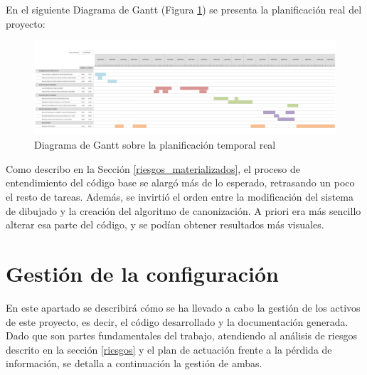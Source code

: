 \begin{landscape}

En el siguiente Diagrama de Gantt (Figura \ref{fig:gantt_real}) se presenta la planificación real del proyecto:

    \begin{figure}[h!]
        \centering
        \includegraphics[scale=0.9]{imagenes/planificacion/planificacion_real.png}
        \caption{Diagrama de Gantt sobre la planificación temporal real}
        \label{fig:gantt_real}
    \end{figure}
\end{landscape}

% 


Como describo en la Sección \ref{riesgos_materializados}, el proceso de entendimiento del código base se alargó más de lo esperado, retrasando un poco el resto de tareas. Además, se invirtió el orden entre la modificación del sistema de dibujado y la creación del algoritmo de canonización. A priori era más sencillo alterar esa parte del código, y se podían obtener resultados más visuales.

\section{Gestión de la configuración}
En este apartado se describirá cómo se ha llevado a cabo la gestión de los activos de este proyecto, es decir, el código desarrollado y la documentación generada. Dado que son partes fundamentales del trabajo, atendiendo al análisis de riesgos descrito en la sección \ref{riesgos} y el plan de actuación frente a la pérdida de información, se detalla a continuación la gestión de ambas.

